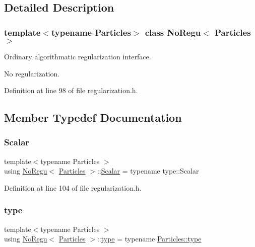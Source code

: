 \subsection{Detailed Description}
\subsubsection*{template$<$typename Particles$>$\newline
class No\+Regu$<$ Particles $>$}

Ordinary algorithmatic regularization interface. 

No regularization. 

Definition at line 98 of file regularization.\+h.



\subsection{Member Typedef Documentation}
\mbox{\label{class_no_regu_af6597c7ec828f8630895903da9251be4}} 
\subsubsection{\texorpdfstring{Scalar}{Scalar}}
{\footnotesize\ttfamily template$<$typename Particles $>$ \\
using \mbox{\hyperlink{class_no_regu}{No\+Regu}}$<$ \mbox{\hyperlink{struct_particles}{Particles}} $>$\+::\mbox{\hyperlink{class_no_regu_af6597c7ec828f8630895903da9251be4}{Scalar}} =  typename type\+::\+Scalar}



Definition at line 104 of file regularization.\+h.

\mbox{\label{class_no_regu_acdfb043f122617376d117cadd040e220}} 
\subsubsection{\texorpdfstring{type}{type}}
{\footnotesize\ttfamily template$<$typename Particles $>$ \\
using \mbox{\hyperlink{class_no_regu}{No\+Regu}}$<$ \mbox{\hyperlink{struct_particles}{Particles}} $>$\+::\mbox{\hyperlink{class_no_regu_acdfb043f122617376d117cadd040e220}{type}} =  typename \mbox{\hyperlink{class_vel_indep_particles_a0c62b43c2f0a50565e5e06587fddee18}{Particles\+::type}}}




